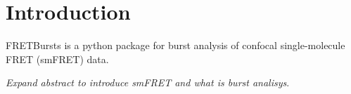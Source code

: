 \section{Introduction}

FRETBursts is a python package for burst analysis of confocal single-molecule FRET 
(smFRET) data.

\textit{Expand abstract to introduce smFRET and what is burst analisys}.

